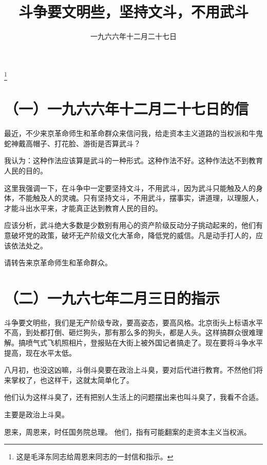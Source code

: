 
\title{斗争要文明些，坚持文斗，不用武斗}
\date{一九六六年十二月二十七日}
\thanks{这是毛泽东同志给周恩来同志的一封信和指示。}
\maketitle


\section*{（一）一九六六年十二月二十七日的信}


最近，不少来京革命师生和革命群众来信问我，给走资本主义道路的当权派和牛鬼蛇神戴高帽子、打花脸、游街是否算武斗？

我认为：这种作法应该算是武斗的一种形式。这种作法不好。这种作法达不到教育人民的目的。

这里我强调一下，在斗争中一定要坚持文斗，不用武斗，因为武斗只能触及人的身体，不能触及人的灵魂。只有坚持文斗，不用武斗，摆事实，讲道理，以理服人，才能斗出水平来，才能真正达到教育人民的目的。

应该分析，武斗绝大多数是少数别有用心的资产阶级反动分子挑动起来的，他们有意破坏党的政策，破坏无产阶级文化大革命，降低党的威信。凡是动手打人的，应该依法处之。

请转告来京革命师生和革命群众。

\section*{（二）一九六七年二月三日的指示}

斗争要文明些，我们是无产阶级专政，要高姿态，要高风格。北京街头上标语水平不高，到处都打倒、砸烂狗头，那有那么多的狗头，都是人头。这样搞群众很难理解。搞喷气式飞机照相片，登报贴在大街上被外国记者搞走了。现在要将斗争水平提高，现在水平太低。

八月初，也没这凶嘛，斗倒斗臭要在政治上斗臭，要对后代进行教育。不然他们将来掌权了，也这样干，这就太简单化了。

他们认为这样斗臭了，还有把别人生活上的问题摆出来也叫斗臭了，我看不合适。

主要是政治上斗臭。

\begin{maonote}
恩来，周恩来，时任国务院总理。
他们，指有可能翻案的走资本主义当权派。
\end{maonote}
